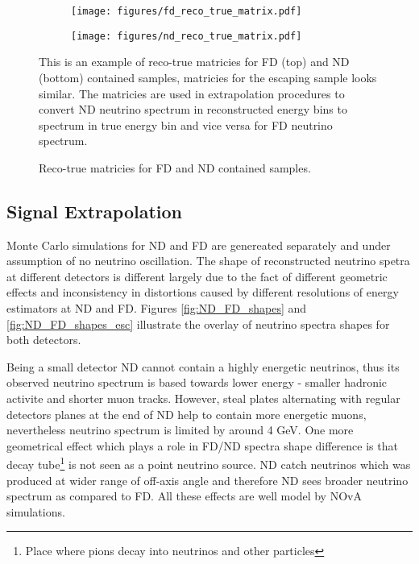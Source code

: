 \begin{figure}[th]
\centering
\begin{subfigure}[t]{0.95\textwidth}
  \centering
  \texttt{[image: figures/fd\_reco\_true\_matrix.pdf]}
\end{subfigure}
\vspace{0.5cm}
\newline
\begin{subfigure}[t]{0.95\textwidth}
  \centering
  \texttt{[image: figures/nd\_reco\_true\_matrix.pdf]}
\end{subfigure}
\caption{ Reco-true matricies for FD and ND contained samples. }
{ This is an example of reco-true matricies for FD (top) and ND (bottom) contained samples, matricies for the
escaping sample looks similar. The matricies are used in extrapolation procedures to convert ND neutrino spectrum
in reconstructed energy bins to spectrum in true energy bin and vice versa for FD neutrino spectrum. }
\label{fig:reco_true_matricies}
\end{figure}
\clearpage

\subsection{Signal Extrapolation} \label{extrap_procedure}
Monte Carlo simulations for ND and FD are genereated separately and under assumption of no neutrino
oscillation. The shape of reconstructed neutrino spetra at different detectors is different largely due
to the fact of different geometric effects and inconsistency in distortions caused by different
resolutions of energy estimators at ND and FD. Figures \ref{fig:ND_FD_shapes} and \ref{fig:ND_FD_shapes_esc}
illustrate the overlay of neutrino spectra shapes for both detectors.

Being a small detector ND cannot contain a highly energetic neutrinos, thus its observed neutrino
spectrum is based towards lower energy - smaller hadronic activite and shorter muon tracks. However,
steal plates alternating with regular detectors planes at the end of ND help to contain more
energetic muons, nevertheless neutrino spectrum is limited by around 4 GeV. One more geometrical effect
which plays a role in FD/ND spectra shape difference is that decay tube\footnote{Place where pions
decay into neutrinos and other particles} is not seen as a point neutrino source. ND catch neutrinos
which was produced at wider range of off-axis angle and therefore ND sees broader neutrino spectrum 
as compared to FD. All these effects are well model by NOvA simulations.

